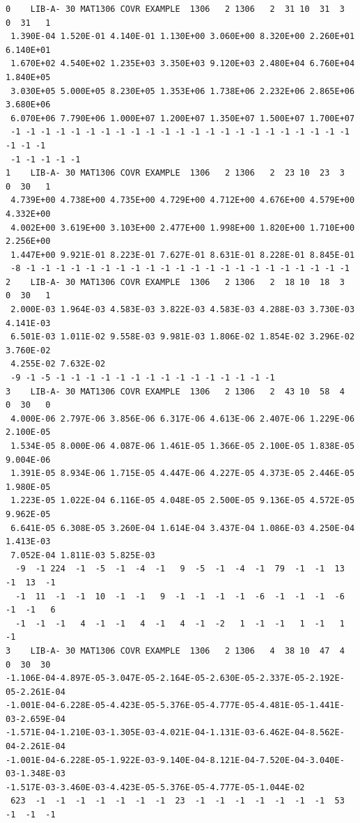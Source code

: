 \small
\begin{verbatim}
0    LIB-A- 30 MAT1306 COVR EXAMPLE  1306   2 1306   2  31 10  31  3   0  31   1
 1.390E-04 1.520E-01 4.140E-01 1.130E+00 3.060E+00 8.320E+00 2.260E+01 6.140E+01
 1.670E+02 4.540E+02 1.235E+03 3.350E+03 9.120E+03 2.480E+04 6.760E+04 1.840E+05
 3.030E+05 5.000E+05 8.230E+05 1.353E+06 1.738E+06 2.232E+06 2.865E+06 3.680E+06
 6.070E+06 7.790E+06 1.000E+07 1.200E+07 1.350E+07 1.500E+07 1.700E+07
 -1 -1 -1 -1 -1 -1 -1 -1 -1 -1 -1 -1 -1 -1 -1 -1 -1 -1 -1 -1 -1 -1 -1 -1 -1 -1
 -1 -1 -1 -1 -1
1    LIB-A- 30 MAT1306 COVR EXAMPLE  1306   2 1306   2  23 10  23  3   0  30   1
 4.739E+00 4.738E+00 4.735E+00 4.729E+00 4.712E+00 4.676E+00 4.579E+00 4.332E+00
 4.002E+00 3.619E+00 3.103E+00 2.477E+00 1.998E+00 1.820E+00 1.710E+00 2.256E+00
 1.447E+00 9.921E-01 8.223E-01 7.627E-01 8.631E-01 8.228E-01 8.845E-01
 -8 -1 -1 -1 -1 -1 -1 -1 -1 -1 -1 -1 -1 -1 -1 -1 -1 -1 -1 -1 -1 -1 -1
2    LIB-A- 30 MAT1306 COVR EXAMPLE  1306   2 1306   2  18 10  18  3   0  30   1
 2.000E-03 1.964E-03 4.583E-03 3.822E-03 4.583E-03 4.288E-03 3.730E-03 4.141E-03
 6.501E-03 1.011E-02 9.558E-03 9.981E-03 1.806E-02 1.854E-02 3.296E-02 3.760E-02
 4.255E-02 7.632E-02
 -9 -1 -5 -1 -1 -1 -1 -1 -1 -1 -1 -1 -1 -1 -1 -1 -1 -1
3    LIB-A- 30 MAT1306 COVR EXAMPLE  1306   2 1306   2  43 10  58  4   0  30   0
 4.000E-06 2.797E-06 3.856E-06 6.317E-06 4.613E-06 2.407E-06 1.229E-06 2.100E-05
 1.534E-05 8.000E-06 4.087E-06 1.461E-05 1.366E-05 2.100E-05 1.838E-05 9.004E-06
 1.391E-05 8.934E-06 1.715E-05 4.447E-06 4.227E-05 4.373E-05 2.446E-05 1.980E-05
 1.223E-05 1.022E-04 6.116E-05 4.048E-05 2.500E-05 9.136E-05 4.572E-05 9.962E-05
 6.641E-05 6.308E-05 3.260E-04 1.614E-04 3.437E-04 1.086E-03 4.250E-04 1.413E-03
 7.052E-04 1.811E-03 5.825E-03
  -9  -1 224  -1  -5  -1  -4  -1   9  -5  -1  -4  -1  79  -1  -1  13  -1  13  -1
  -1  11  -1  -1  10  -1  -1   9  -1  -1  -1  -1  -6  -1  -1  -1  -6  -1  -1   6
  -1  -1  -1   4  -1  -1   4  -1   4  -1  -2   1  -1  -1   1  -1   1  -1
3    LIB-A- 30 MAT1306 COVR EXAMPLE  1306   2 1306   4  38 10  47  4   0  30  30
-1.106E-04-4.897E-05-3.047E-05-2.164E-05-2.630E-05-2.337E-05-2.192E-05-2.261E-04
-1.001E-04-6.228E-05-4.423E-05-5.376E-05-4.777E-05-4.481E-05-1.441E-03-2.659E-04
-1.571E-04-1.210E-03-1.305E-03-4.021E-04-1.131E-03-6.462E-04-8.562E-04-2.261E-04
-1.001E-04-6.228E-05-1.922E-03-9.140E-04-8.121E-04-7.520E-04-3.040E-03-1.348E-03
-1.517E-03-3.460E-03-4.423E-05-5.376E-05-4.777E-05-1.044E-02
 623  -1  -1  -1  -1  -1  -1  -1  23  -1  -1  -1  -1  -1  -1  -1  53  -1  -1  -1

\end{verbatim}
